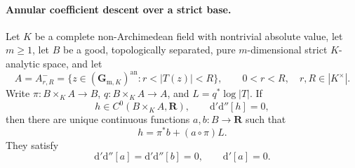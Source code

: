 \paragraph{Annular coefficient descent over a strict base.}
\begin{proposition}
\label{prop:p062-annulus-coefficient-descent}
Let \(K\) be a complete non-Archimedean field with nontrivial absolute
value, let \(m\geq1\), let \(B\) be a good, topologically separated, pure
\(m\)-dimensional strict \(K\)-analytic space, and let
\[
 A=A^-_{r,R}=\{z\in(\mathbf G_{\mathrm m,K})^{\mathrm{an}}:
                         r<|T(z)|<R\},
 \qquad 0<r<R,\quad r,R\in|K^\times|.
\]
Write \(\pi:B\times_KA\to B\), \(q:B\times_KA\to A\), and
\(L=q^*\log|T|\).  If
\[
 h\in C^0(B\times_KA,\mathbf R),\qquad
 \mathrm d'\mathrm d''[h]=0,
\]
then there are unique continuous functions \(a,b:B\to\mathbf R\) such
that
\[
                             h=\pi^*b+(a\circ\pi)L.
\]
They satisfy
\[
 \mathrm d'\mathrm d''[a]=\mathrm d'\mathrm d''[b]=0,
 \qquad \mathrm d'[a]=0.
\]
\end{proposition}

